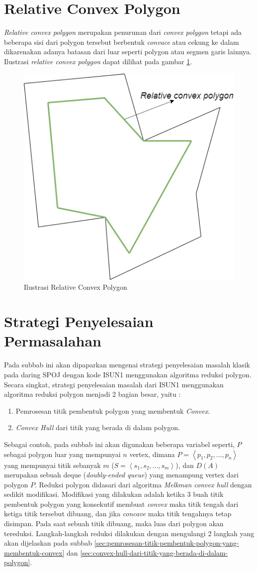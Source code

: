 \section{ Relative Convex Polygon}
\textit{Relative convex polygon} merupakan penurunan dari \textit{convex polygon} tetapi ada beberapa sisi dari polygon tersebut berbentuk \textit{convace} atau cekung ke dalam dikarenakan adanya batasan dari luar seperti polygon atau segmen garis lainnya. Ilustrasi \textit{relative convex polygon} dapat dilihat pada gambar \ref{fig:ilustrasi-relative-convex-polygon}.
\begin{figure}[!h]
    \Centering
    \includegraphics[width=0.5\columnwidth]{bab2/img/ilustrasi-relative-convex-polygon}
    \caption{Ilustrasi Relative Convex Polygon}
    \label{fig:ilustrasi-relative-convex-polygon}
\end{figure}
\section{ Strategi Penyelesaian Permasalahan}
Pada subbab ini akan dipaparkan mengenai strategi penyelesaian masalah klasik pada daring SPOJ dengan kode ISUN1 menggunakan algoritma reduksi polygon. Secara singkat, strategi penyelesaian masalah dari ISUN1 menggunakan algoritma reduksi polygon menjadi 2 bagian besar, yaitu :
\begin{enumerate}
    \item Pemrosesan titik pembentuk polygon yang membentuk \textit{Convex}.
    \item \textit{Convex Hull} dari titik yang berada di dalam polygon.
\end{enumerate}
Sebagai contoh, pada subbab ini akan digunakan beberapa variabel seperti, $P$ sebagai polygon luar yang mempunyai $n$ vertex, dimana $P = \left \langle p_1, p_2, ..., p_n \right \rangle$ yang mempunyai titik sebanyak $m$ ($S = \left \langle s_1, s_2, ..., s_m \right \rangle$), dan $D(A)$ merupakan sebuah deque (\textit{doubly-ended queue}) yang menampung vertex dari polygon $P$. Reduksi polygon didasari dari algoritma \textit{Melkman convex hull} dengan sedikit modifikasi. Modifikasi yang dilakukan adalah ketika 3 buah titik pembentuk polygon yang konsekutif membuat \textit{convex} maka titik tengah dari ketiga titik tersebut dibuang, dan jika \textit{concave} maka titik tengahnya tetap disimpan. Pada saat sebuah titik dibuang, maka luas dari polygon akan tereduksi. Langkah-langkah reduksi dilakukan dengan mengulangi 2 langkah yang akan dijelaskan pada subbab \ref{sec:pemrosesan-titik-pembentuk-polygon-yang-membentuk-convex} dan \ref{sec:convex-hull-dari-titik-yang-berada-di-dalam-polygon}.


